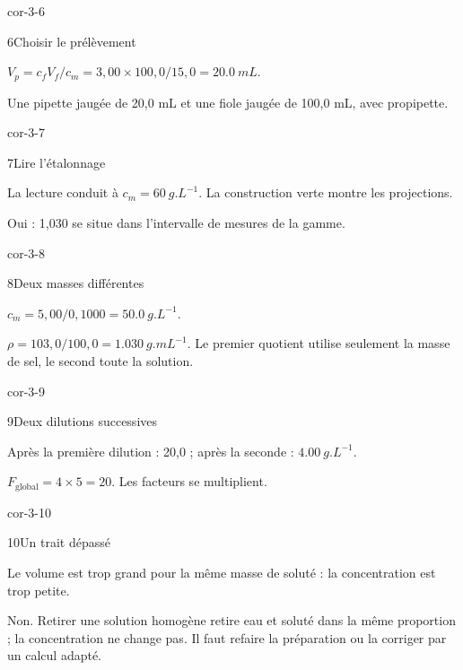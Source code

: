 \begin{blocLivre}{cor-3-6}\begin{corrige}{6}{Choisir le prélèvement}
\begin{questions}
\item $V_p=c_fV_f/c_m=3,00\times100,0/15,0=\qty{20,0}{mL}$.
\item Une pipette jaugée de 20,0 mL et une fiole jaugée de 100,0 mL, avec propipette.
\end{questions}
\end{corrige}\end{blocLivre}
\begin{blocLivre}{cor-3-7}\begin{corrige}{7}{Lire l’étalonnage}
\begin{questions}
\item La lecture conduit à $c_m=\qty{60}{g.L^{-1}}$. La construction verte montre les projections.
\item Oui : 1,030 se situe dans l’intervalle de mesures de la gamme.
\end{questions}
\end{corrige}\end{blocLivre}
\begin{blocLivre}{cor-3-8}\begin{corrige}{8}{Deux masses différentes}
\begin{questions}
\item $c_m=5,00/0,1000=\qty{50,0}{g.L^{-1}}$.
\item $\rho=103,0/100,0=\qty{1,030}{g.mL^{-1}}$. Le premier quotient utilise seulement la masse de sel, le second toute la solution.
\end{questions}
\end{corrige}\end{blocLivre}
\clearpage
\begin{blocLivre}{cor-3-9}\begin{corrige}{9}{Deux dilutions successives}
\begin{questions}
\item Après la première dilution : 20,0 ; après la seconde : $\qty{4,00}{g.L^{-1}}$.
\item $F_{\mathrm{global}}=4\times5=20$. Les facteurs se multiplient.
\end{questions}
\end{corrige}\end{blocLivre}
\begin{blocLivre}{cor-3-10}\begin{corrige}{10}{Un trait dépassé}
\begin{questions}
\item Le volume est trop grand pour la même masse de soluté : la concentration est trop petite.
\item Non. Retirer une solution homogène retire eau et soluté dans la même proportion ; la concentration ne change pas. Il faut refaire la préparation ou la corriger par un calcul adapté.
\end{questions}
\end{corrige}\end{blocLivre}
